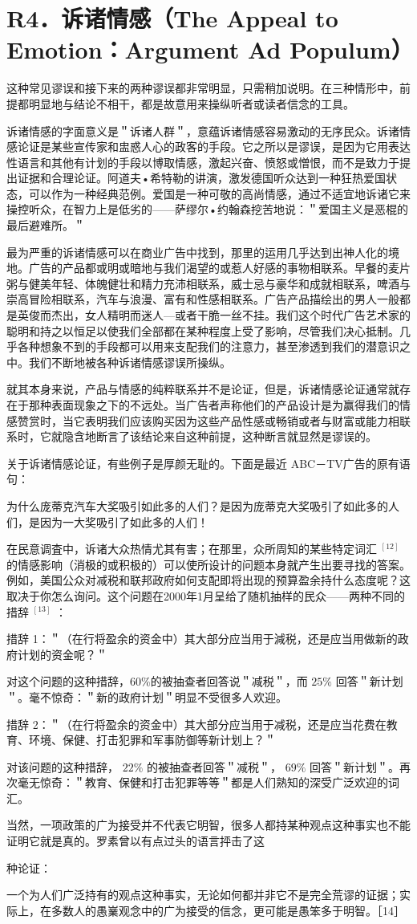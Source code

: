 \section*{R4．诉诸情感（The Appeal to Emotion：Argument Ad Populum）}
这种常见谬误和接下来的两种谬误都非常明显，只需稍加说明。在三种情形中，前提都明显地与结论不相干，都是故意用来操纵听者或读者信念的工具。

诉诸情感的字面意义是＂诉诸人群＂，意蕴诉诸情感容易激动的无序民众。诉诸情感论证是某些宣传家和盅惑人心的政客的手段。它之所以是谬误，是因为它用表达性语言和其他有计划的手段以博取情感，激起兴奋、愤怒或憎恨，而不是致力于提出证据和合理论证。阿道夫•希特勒的讲演，激发德国听众达到一种狂热爱国状态，可以作为一种经典范例。爱国是一种可敬的高尚情感，通过不适宜地诉诸它来操控听众，在智力上是低劣的——萨缪尔•约翰森挖苦地说：＂爱国主义是恶棍的最后避难所。＂

最为严重的诉诸情感可以在商业广告中找到，那里的运用几乎达到出神人化的境地。广告的产品都或明或暗地与我们渴望的或惹人好感的事物相联系。早餐的麦片粥与健美年轻、体魄健壮和精力充沛相联系，威士忌与豪华和成就相联系，啤酒与崇高冒险相联系，汽车与浪漫、富有和性感相联系。广告产品描绘出的男人一般都是英俊而杰出，女人精明而迷人—或者干脆一丝不挂。我们这个时代广告艺术家的聪明和持之以恒足以使我们全部都在某种程度上受了影响，尽管我们决心抵制。几乎各种想象不到的手段都可以用来支配我们的注意力，甚至渗透到我们的潜意识之中。我们不断地被各种诉诸情感谬误所操纵。

就其本身来说，产品与情感的纯粹联系并不是论证，但是，诉诸情感论证通常就存在于那种表面现象之下的不远处。当广告者声称他们的产品设计是为赢得我们的情感赞赏时，当它表明我们应该购买因为这些产品性感或畅销或者与财富或能力相联系时，它就隐含地断言了该结论来自这种前提，这种断言就显然是谬误的。

关于诉诸情感论证，有些例子是厚颜无耻的。下面是最近 ABC－TV广告的原有语句：

为什么庞蒂克汽车大奖吸引如此多的人们？是因为庞蒂克大奖吸引了如此多的人们，是因为一大奖吸引了如此多的人们！

在民意调査中，诉诸大众热情尤其有害；在那里，众所周知的某些特定词汇 ${ }^{[12]}$ 的情感影响（消极的或积极的）可以使所设计的问题本身就产生出要寻找的答案。例如，美国公众对减税和联邦政府如何支配即将出现的预算盈余持什么态度呢？这取决于你怎么询问。这个问题在2000年1月呈给了随机抽样的民众——两种不同的措辞 ${ }^{[13]}$ ：

措辞 1：＂（在行将盈余的资金中）其大部分应当用于減税，还是应当用做新的政府计划的资金呢？＂

对这个问题的这种措辞，60\%的被抽查者回答说＂减税＂，而 $25 \%$ 回答＂新计划＂。毫不惊奇：＂新的政府计划＂明显不受很多人欢迎。

措辞 2：＂（在行将盈余的资金中）其大部分应当用于减税，还是应当花费在教育、环境、保健、打击犯罪和军事防御等新计划上？＂

对该问题的这种措辞， $22 \%$ 的被抽查者回答＂减税＂， $69 \%$ 回答＂新计划＂。再次毫无惊奇：＂教育、保健和打击犯罪等等＂都是人们熟知的深受广泛欢迎的词汇。

当然，一项政策的广为接受并不代表它明智，很多人都持某种观点这种事实也不能证明它就是真的。罗素曾以有点过头的语言抨击了这

种论证：

一个为人们广泛持有的观点这种事实，无论如何都并非它不是完全荒谬的证据；实际上，在多数人的愚嶪观念中的广为接受的信念，更可能是愚笨多于明智。［14］ 
